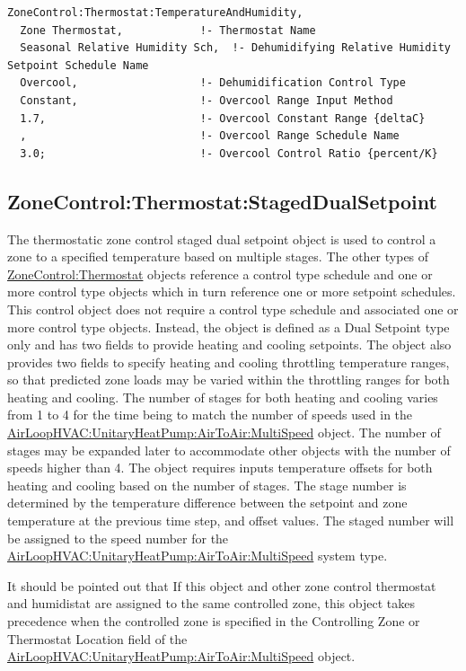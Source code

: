 \begin{lstlisting}
ZoneControl:Thermostat:TemperatureAndHumidity,
  Zone Thermostat,            !- Thermostat Name
  Seasonal Relative Humidity Sch,  !- Dehumidifying Relative Humidity Setpoint Schedule Name
  Overcool,                   !- Dehumidification Control Type
  Constant,                   !- Overcool Range Input Method
  1.7,                        !- Overcool Constant Range {deltaC}
  ,                           !- Overcool Range Schedule Name
  3.0;                        !- Overcool Control Ratio {percent/K}
\end{lstlisting}

\subsection{ZoneControl:Thermostat:StagedDualSetpoint}\label{zonecontrolthermostatstageddualsetpoint}

The thermostatic zone control staged dual setpoint object is used to control a zone to a specified temperature based on multiple stages. The other types of \hyperref[zonecontrolthermostat]{ZoneControl:Thermostat} objects reference a control type schedule and one or more control type objects which in turn reference one or more setpoint schedules. This control object does not require a control type schedule and associated one or more control type objects. Instead, the object is defined as a Dual Setpoint type only and has two fields to provide heating and cooling setpoints. The object also provides two fields to specify heating and cooling throttling temperature ranges, so that predicted zone loads may be varied within the throttling ranges for both heating and cooling. The number of stages for both heating and cooling varies from 1 to 4 for the time being to match the number of speeds used in the \hyperref[airloophvacunitaryheatpumpairtoairmultispeed]{AirLoopHVAC:UnitaryHeatPump:AirToAir:MultiSpeed} object. The number of stages may be expanded later to accommodate other objects with the number of speeds higher than 4. The object requires inputs temperature offsets for both heating and cooling based on the number of stages. The stage number is determined by the temperature difference between the setpoint and zone temperature at the previous time step, and offset values. The staged number will be assigned to the speed number for the \hyperref[airloophvacunitaryheatpumpairtoairmultispeed]{AirLoopHVAC:UnitaryHeatPump:AirToAir:MultiSpeed} system type.

It should be pointed out that If this object and other zone control thermostat and humidistat are assigned to the same controlled zone, this object takes precedence when the controlled zone is specified in the Controlling Zone or Thermostat Location field of the \hyperref[airloophvacunitaryheatpumpairtoairmultispeed]{AirLoopHVAC:UnitaryHeatPump:AirToAir:MultiSpeed} object.

